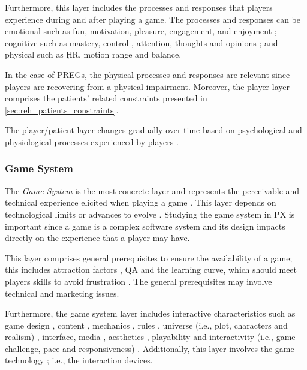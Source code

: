 Furthermore, this layer includes the processes and responses that players experience during and after playing a game. The processes and responses can be emotional such as fun, motivation, pleasure, engagement, \autocite{Fernandez2008,Ferrara} and enjoyment \autocite{Nacked}; cognitive such as mastery, control \autocite{Ferrara}, attention, thoughts and opinions \autocite{Fernandez2008}; and physical such as \c{HR}, motion range and balance.

In the case of \acp{PREG}, the physical processes and responses are relevant since players are recovering from a physical impairment. Moreover, the player layer comprises the patients' related constraints presented in \autoref{sec:reh_patients_constraints}.

The player/patient layer changes gradually over time based on psychological and physiological processes experienced by players \autocite{Nackea2}.

\subsubsection*{Game System}
The \textit{Game System} is the most concrete layer and represents the perceivable and technical experience elicited when playing a game \autocite{Nackea2,Elson2014,Nackea,Nacked}. This layer depends on technological limits or advances to evolve \autocite{Fernandez2008}. Studying the game system in \ac{PX} is important since a game is a complex software system \autocite{Mayra,Nackea} and its design impacts directly on the experience that a player may have.

This layer comprises general prerequisites to ensure the availability of a game; this includes attraction factors \autocite{Elson2014}, \ac{QA} \autocite{Nacked} and the learning curve, which should meet players skills to avoid frustration \autocite{Nacked}. The general prerequisites may involve technical \autocite{Fernandez2008,Engl2013,Nackea2} and marketing \autocite{Nacked} issues.

Furthermore, the game system layer includes interactive characteristics such as game design \autocite{Nacked}, content \autocite{Elson2014,Nackea2,Fernandez2008}, mechanics \autocite{Elson2014,Ferrara}, rules \autocite{Nackea}, universe (i.e., plot, characters and realism) \autocite{Fernandez2008,Ferrara}, interface, media \autocite{DeKort2007b,Fernandez2008}, aesthetics \autocite{Ferrara}, playability \autocite{Engl2013,Fernandez2008} and interactivity (i.e., game challenge, pace and responsiveness) \autocite{Fernandez2008}. Additionally, this layer involves the game technology \autocite{Engl2013,Fernandez2008}; i.e., the interaction devices.


